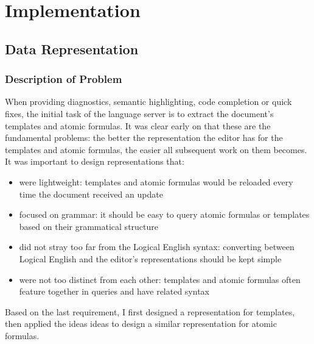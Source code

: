 \documentclass[../main.tex]{subfiles}
\begin{document}
\chapter{Implementation}
\section{Data Representation}
\subsection{Description of Problem}
When providing diagnostics, semantic highlighting, code completion or quick fixes, the initial task of the language server is to extract the document's templates and atomic formulas. It was clear early on that these are the fundamental problems: the better the representation the editor has for the templates and atomic formulas, the easier all subsequent work on them becomes. It was important to design representations that:
\begin{itemize}
    \item were lightweight: templates and atomic formulas would be reloaded every time the document received an update
    \item focused on grammar: it should be easy to query atomic formulas or templates based on their grammatical structure
    \item did not stray too far from the Logical English syntax: converting between Logical English and the editor's representations should be kept simple
    \item were not too distinct from each other: templates and atomic formulas often feature together in queries and have related syntax
\end{itemize}
Based on the last requirement, I first designed a representation for templates, then applied the ideas ideas to design a similar representation for atomic formulas. 
\end{document}
